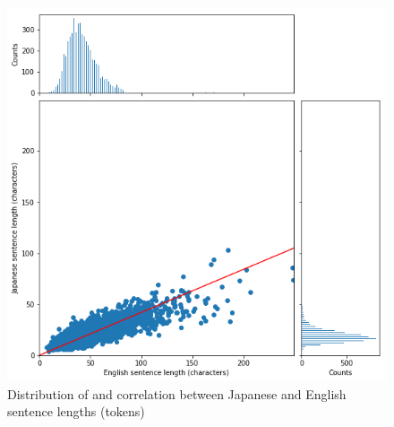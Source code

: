 \documentclass[answers]{exam}
\begin{document}
\begin{figure}
  \centering
  \includegraphics[width=\linewidth]{fig-chars}
  \caption[Sentence lenths (characters)]%
  {Distribution of and correlation between Japanese and English sentence lengths (tokens)}
  \label{fig:chars}
\end{figure}
\end{document}
